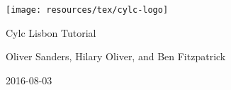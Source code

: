 \thispagestyle{empty}

\begin{titlepage}
    \begin{center}
        \texttt{[image: resources/tex/cylc-logo]}

        \Huge{Cylc Lisbon Tutorial}

        \large{Oliver Sanders, Hilary Oliver, and Ben Fitzpatrick}

        \small{2016-08-03}
    \end{center}

\tableofcontents
\end{titlepage}
